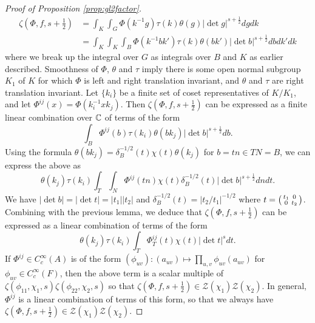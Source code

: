 \begin{proof}[Proof of Proposition \ref{prop:gl2factor}]
    \begin{equation*}
        \begin{split}
            \zeta\left(\Phi,f,s+\frac{1}{2}\right) &= \int_K \int_G \Phi(k^{-1}g) \tau(k)\theta(g) |\det g|^{s+\frac{1}{2}} dg dk \\
            &= \int_K \int_K \int_B \Phi(k^{-1}bk') \tau(k)\theta(bk') |\det b|^{s+\frac{1}{2}} db dk' dk
        \end{split}
    \end{equation*}
    where we break up the integral over $G$ as integrals over $B$ and $K$ as earlier described. Smoothness of $\Phi$, $\theta$ and $\tau$ imply there is some open normal subgroup $K_1$ of $K$ for which $\Phi$ is left and right translation invariant, and $\theta$ and $\tau$ are right translation invariant. Let $\{k_i\}$ be a finite set of coset representatives of $K/K_1$, and let $\Phi^{ij}(x) = \Phi(k_i^{-1}xk_j)$. Then $\zeta(\Phi,f,s+\frac{1}{2})$ can be expressed as a finite linear combination over $\mathbb{C}$ of terms of the form 
    $$\int_B \Phi^{ij}(b) \tau(k_i)\theta(bk_j) |\det b|^{s+\frac{1}{2}} db.$$
    Using the formula $\theta(bk_j) = \delta_B^{-1/2}(t)\chi(t)\theta(k_j)$ for $b=tn \in TN =B$, we can express the above as
    $$\theta(k_j)\tau(k_i) \int_T\int_N \Phi^{ij}(tn) \chi(t)\delta_B^{-1/2}(t) |\det b|^{s+\frac{1}{2}} dn dt.$$
    We have $|\det b|=|\det t| = |t_1| |t_2|$ and $\delta_B^{-1/2}(t) = |t_2/t_1|^{-1/2}$ where $t= \begin{psmallmatrix} t_1&0 \\0&t_2 \end{psmallmatrix}$. Combining with the previous lemma, we deduce that $\zeta(\Phi,f,s+\frac{1}{2})$ can be expressed as a linear combination of terms of the form 
    $$\theta(k_j)\tau(k_i) \int_T \Phi_T^{ij}(t) \chi(t) |\det t|^s dt.$$
    If $\Phi^{ij} \in C_c^\infty(A)$ is of the form $(\phi_{uv}): (a_{uv}) \mapsto \prod\limits_{u,v} \phi_{uv}(a_{uv})$ for $\phi_{uv} \in C_c^\infty(F)$, then the above term is a scalar multiple of $\zeta(\phi_{11},\chi_1,s)\zeta(\phi_{22},\chi_2,s)$ so that $\zeta(\Phi,f,s+\frac{1}{2}) \in \mathcal Z(\chi_1)\mathcal Z(\chi_2)$. In general, $\Phi^{ij}$ is a linear combination of terms of this form, so that we always have $\zeta(\Phi,f,s+\frac{1}{2}) \in \mathcal Z(\chi_1)\mathcal Z(\chi_2)$.


\end{proof}
